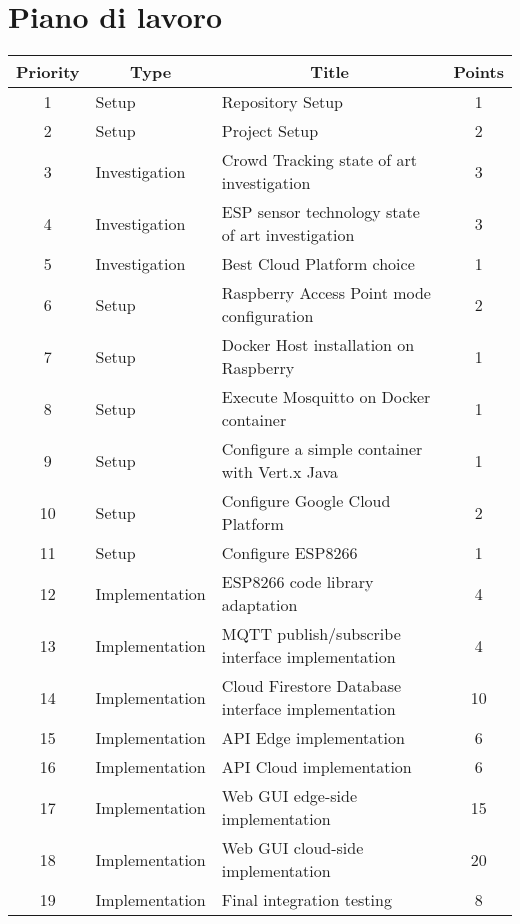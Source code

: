\section{Piano di lavoro}

\begin{table}[htbp]
  \begin{tabularx}{\textwidth}{|c|l|X|c|}
    \hline
    \textbf{Priority} & \multicolumn{1}{c|}{\textbf{Type}} & \multicolumn{1}{c|}{\textbf{Title}} & \textbf{Points} \\ \hline
    1 & Setup & Repository Setup & 1 \\ \hline
    2 & Setup & Project Setup & 2 \\ \hline
    3 & Investigation & Crowd Tracking state of art investigation & 3 \\ \hline
    4 & Investigation & ESP sensor technology state of art investigation & 3 \\ \hline
    5 & Investigation & Best Cloud Platform choice & 1 \\ \hline
    6 & Setup & Raspberry Access Point mode configuration & 2 \\ \hline
    7 & Setup & Docker Host installation on Raspberry & 1 \\ \hline
    8 & Setup & Execute Mosquitto on Docker container & 1 \\ \hline
    9 & Setup & Configure a simple container with Vert.x Java & 1 \\ \hline
    10 & Setup & Configure Google Cloud Platform & 2 \\ \hline
    11 & Setup & Configure ESP8266 & 1 \\ \hline
    12 & Implementation & ESP8266 code library adaptation & 4 \\ \hline
    13 & Implementation & MQTT publish/subscribe interface implementation & 4 \\ \hline
    14 & Implementation & Cloud Firestore Database interface implementation & 10 \\ \hline
    15 & Implementation & API Edge implementation & 6 \\ \hline
    16 & Implementation & API Cloud implementation & 6 \\ \hline
    17 & Implementation & Web GUI edge-side implementation & 15 \\ \hline
    18 & Implementation & Web GUI cloud-side implementation & 20 \\ \hline
    19 & Implementation & Final integration testing & 8 \\ \hline
  \end{tabularx}
\end{table}

